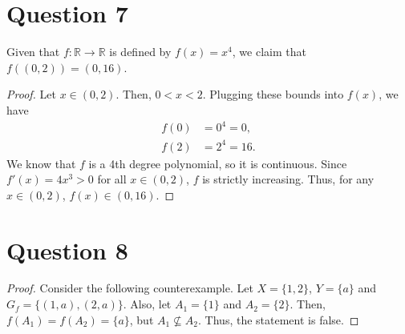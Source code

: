 \documentclass{article}
\begin{document}
\section*{Question 7}
Given that $f: \mathbb{R} \to \mathbb{R}$ is defined by $f(x) = x^4$, we claim that $f((0, 2)) = (0, 16)$.

\begin{proof}
Let $x \in (0, 2)$.
Then, $0 < x < 2$.
Plugging these bounds into $f(x)$, we have
\begin{align*}
    f(0) &= 0^4 = 0, \\
    f(2) &= 2^4 = 16.
\end{align*}
We know that $f$ is a 4th degree polynomial, so it is continuous.
Since $f'(x) = 4x^3 > 0$ for all $x \in (0, 2)$, $f$ is strictly increasing.
Thus, for any $x \in (0, 2)$, $f(x) \in (0, 16)$.
\end{proof}

\section*{Question 8}
\renewcommand*{\proofname}{Disproof}
\begin{proof}
Consider the following counterexample.
Let $X = \{1, 2\}$, $Y = \{a\}$ and $G_f = \{(1, a), (2, a)\}$.
Also, let $A_1 = \{1\}$ and $A_2 = \{2\}$.
Then, $f(A_1) = f(A_2) = \{a\}$, but $A_1 \nsubseteq A_2$.
Thus, the statement is false.
\end{proof}
\end{document}
